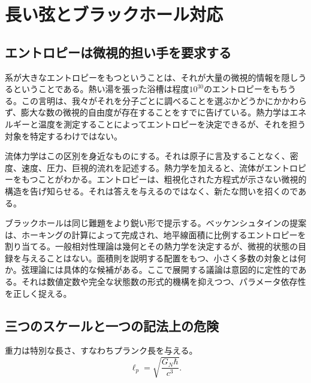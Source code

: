 \chapter{長い弦とブラックホール対応}


\section{エントロピーは微視的担い手を要求する}

系が大きなエントロピーをもつということは、それが大量の微視的情報を隠しうるということである。熱い湯を張った浴槽は程度\(10^{30}\)のエントロピーをもちうる。この言明は、我々がそれを分子ごとに調べることを選ぶかどうかにかかわらず、膨大な数の微視的自由度が存在することをすでに告げている。熱力学はエネルギーと温度を測定することによってエントロピーを決定できるが、それを担う対象を特定するわけではない。

流体力学はこの区別を身近なものにする。それは原子に言及することなく、密度、速度、圧力、巨視的流れを記述する。熱力学を加えると、流体がエントロピーをもつことがわかる。エントロピーは、粗視化された方程式が示さない微視的構造を告げ知らせる。それは答えを与えるのではなく、新たな問いを招くのである。

ブラックホールは同じ難題をより鋭い形で提示する。ベッケンシュタインの提案は、ホーキングの計算によって完成され、地平線面積に比例するエントロピーを割り当てる。一般相対性理論は幾何とその熱力学を決定するが、微視的状態の目録を与えることはない。面積則を説明する配置をもつ、小さく多数の対象とは何か。弦理論には具体的な候補がある。ここで展開する議論は意図的に定性的である。それは数値定数や完全な状態数の形式的機構を抑えつつ、パラメータ依存性を正しく捉える。

\section{三つのスケールと一つの記法上の危険}

重力は特別な長さ、すなわちプランク長を与える。
\begin{equation}
\ell_p=\sqrt{\frac{G_N\hbar}{c^3}}.
\label{eq:l06-planck-si}
\end{equation}

